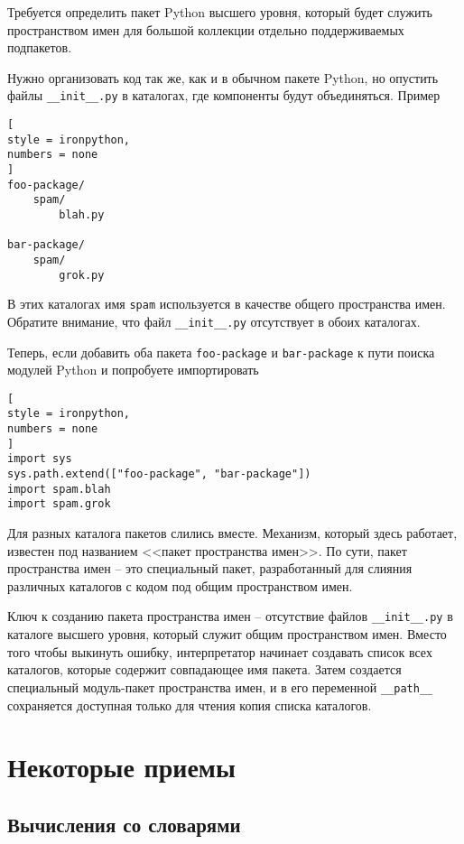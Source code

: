 \documentclass[%
	11pt,
	a4paper,
	utf8,
		]{article}
\begin{document}
Требуется определить пакет Python высшего уровня, который будет служить пространством имен для большой коллекции отдельно поддерживаемых подпакетов.

Нужно организовать код так же, как и в обычном пакете Python, но опустить файлы \verb|__init__.py| в каталогах, где компоненты будут объединяться. Пример \cite[]{beazley:python_cookbook-2019}
\begin{lstlisting}[
style = ironpython,
numbers = none
]
foo-package/
    spam/
        blah.py
        
bar-package/
    spam/
        grok.py
\end{lstlisting}

В этих каталогах имя \texttt{spam} используется в качестве общего пространства имен. Обратите внимание, что файл \verb|__init__.py| отсутствует в обоих каталогах.

Теперь, если добавить оба пакета \texttt{foo-package} и \texttt{bar-package} к пути поиска модулей Python и попробуете импортировать
\begin{lstlisting}[
style = ironpython,
numbers = none
]
import sys
sys.path.extend(["foo-package", "bar-package"])
import spam.blah
import spam.grok
\end{lstlisting}

Для разных каталога пакетов слились вместе. Механизм, который здесь работает, известен под названием <<пакет пространства имен>>. По сути, пакет пространства имен -- это специальный пакет, разработанный для слияния различных каталогов с кодом под общим пространством имен.

Ключ к созданию пакета пространства имен -- отсутствие файлов \verb|__init__.py| в каталоге высшего уровня, который служит общим пространством имен. Вместо того чтобы выкинуть ошибку, интерпретатор начинает создавать список всех каталогов, которые содержит совпадающее имя пакета. Затем создается специальный модуль-пакет пространства имен, и в его переменной \verb|__path__| сохраняется доступная только для чтения копия списка каталогов.





\section{Некоторые приемы}

\subsection{Вычисления со словарями}
\end{document}
